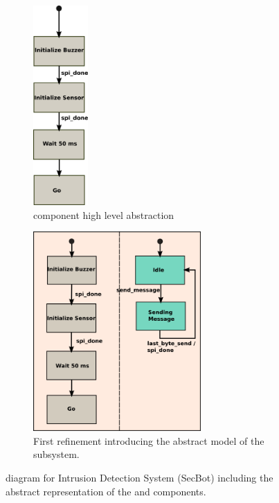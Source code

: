 \begin{figure}[t!]
	    \begin{subfigure}[t]{0.3\textwidth}
	        \begin{centering}
	        \includegraphics[height=3in]{figures/ASIC}
	        \caption{\ASIC component high level abstraction}
	        \label{fig:ASIC}
	        \end{centering}
	    \end{subfigure}
\qquad
	    \begin{subfigure}[t]{0.5\textwidth}
	        \includegraphics[height=3in]{figures/ASIC&SPI_1}
	        \caption{First refinement introducing the abstract model of the \SPI subsystem.}
	        \label{fig:ASIC_SPI_1}
	    \end{subfigure}
	    \caption{\Statechart diagram for Intrusion Detection System (SecBot) including the abstract representation of the \ASIC and \SPI components.}
\end{figure}

